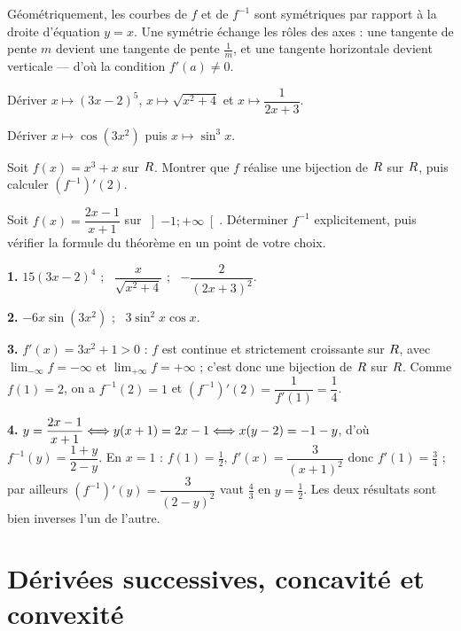 \begin{remarque}
Géométriquement, les courbes de $f$ et de $f^{-1}$ sont symétriques par
rapport à la droite d'équation $y = x$. Une symétrie échange les rôles des
axes : une tangente de pente $m$ devient une tangente de pente $\frac{1}{m}$,
et une tangente horizontale devient verticale — d'où la condition
$f'(a) \neq 0$.
\end{remarque}

\begin{entrainement}
\exo[\niveau{1}] Dériver $x \mapsto (3x-2)^{5}$, $x \mapsto \sqrt{x^{2}+4}$ et
$x \mapsto \dfrac{1}{2x+3}$.

\exo[\niveau{2}] Dériver $x \mapsto \cos(3x^{2})$ puis $x \mapsto \sin^{3} x$.

\exo[\niveau{2}] Soit $f(x) = x^{3}+x$ sur $R$. Montrer que $f$ réalise une
bijection de $R$ sur $R$, puis calculer $\left(f^{-1}\right)'(2)$.

\exo[\niveau{3}] Soit $f(x) = \dfrac{2x-1}{x+1}$ sur $\left]-1 ; +\infty\right[$.
Déterminer $f^{-1}$ explicitement, puis vérifier la formule du théorème en
un point de votre choix.
\end{entrainement}

\begin{corrige}
\textbf{1.} $15(3x-2)^{4}$ ; \ $\dfrac{x}{\sqrt{x^{2}+4}}$ ; \
$-\dfrac{2}{(2x+3)^{2}}$.

\textbf{2.} $-6x\sin(3x^{2})$ ; \ $3\sin^{2}x\cos x$.

\textbf{3.} $f'(x) = 3x^{2}+1 > 0$ : $f$ est continue et strictement
croissante sur $R$, avec $\lim_{-\infty} f = -\infty$ et
$\lim_{+\infty} f = +\infty$ ; c'est donc une bijection de $R$ sur $R$.
Comme $f(1) = 2$, on a $f^{-1}(2) = 1$ et
$\left(f^{-1}\right)'(2) = \dfrac{1}{f'(1)} = \dfrac{1}{4}$.

\textbf{4.} $y = \dfrac{2x-1}{x+1} \Longleftrightarrow y(x+1) = 2x-1 \Longleftrightarrow x(y-2) = -1-y$,
d'où $f^{-1}(y) = \dfrac{1+y}{2-y}$. En $x = 1$ : $f(1) = \tfrac{1}{2}$,
$f'(x) = \dfrac{3}{(x+1)^{2}}$ donc $f'(1) = \tfrac{3}{4}$ ; par ailleurs
$\left(f^{-1}\right)'(y) = \dfrac{3}{(2-y)^{2}}$ vaut $\tfrac{4}{3}$ en
$y = \tfrac{1}{2}$. Les deux résultats sont bien inverses l'un de l'autre.
\end{corrige}

\section{Dérivées successives, concavité et convexité}

